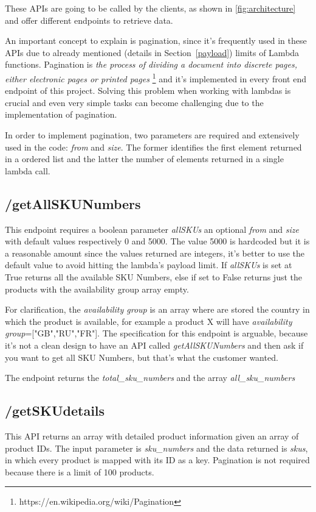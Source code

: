 These APIs are going to be called by the clients, as shown in \ref{fig:architecture} and 
offer different endpoints to retrieve data.

\label{def:pagination}An important concept to explain is pagination, since it's frequently used in these APIs due to 
already mentioned (details in Section~\ref{payload}) limits of Lambda functions.
Pagination is \textit{the process of dividing a document into discrete pages, either electronic pages or printed pages}
\footnote{https://en.wikipedia.org/wiki/Pagination} and it's implemented in every front end endpoint of this project.
Solving this problem when working with lambdas is crucial and even very simple tasks can become challenging due to the
implementation of pagination.

In order to implement pagination, two parameters are required and extensively used in the code: \textit{from} and
\textit{size}. The former identifies the first element returned in a ordered list and the latter 
the number of elements returned in a single lambda call.


\subsection{/getAllSKUNumbers}
\label{sub:getallskunumbers}
This endpoint requires a boolean parameter \textit{allSKUs} an optional \textit{from} and
\textit{size} with default values respectively 0 and 5000. 
 The value 5000 is hardcoded but it is a reasonable amount since the values returned are integers, it's better to use the default value to avoid
 hitting the lambda's payload limit.
 If \textit{allSKUs} is set at True returns all the available SKU Numbers, else if set to False returns just the products with
the availability group array empty.

For clarification, the \textit{availability group} is an array where are stored 
the country in which the product is available, for example
a product X will have  \textit{availability group}=["GB","RU","FR"].
The specification for this endpoint is arguable, because it's not a clean 
design to have an API called \textit{getAllSKUNumbers} and then ask  
if you want to get all SKU Numbers, but that's what the customer wanted.

The endpoint returns  the 
\textit{total\_sku\_numbers} 
and the array \textit{all\_sku\_numbers}

\subsection{/getSKUdetails}
\label{sub:getskudetails}
This API returns an array with detailed product information given an
array of product IDs.  The input parameter is \textit{sku\_numbers }
and the data returned is \textit{skus}, in which every product is
mapped with its ID as a key.  Pagination is not required because there
is a limit of 100 products.

